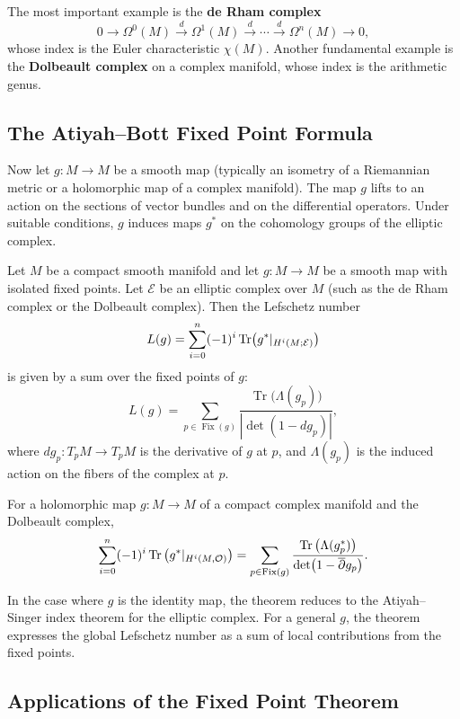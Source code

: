 The most important example is the \textbf{de Rham complex}
\[
0 \to \Omega^0(M) \xrightarrow{d} \Omega^1(M) \xrightarrow{d} \cdots \xrightarrow{d} \Omega^n(M) \to 0,
\]
whose index is the Euler characteristic \(\chi(M)\). Another fundamental example is the \textbf{Dolbeault complex} on a complex manifold, whose index is the arithmetic genus.

\subsection{The Atiyah--Bott Fixed Point Formula}

Now let \(g: M \to M\) be a smooth map (typically an isometry of a Riemannian metric or a holomorphic map of a complex manifold). The map \(g\) lifts to an action on the sections of vector bundles and on the differential operators. Under suitable conditions, \(g\) induces maps \(g^*\) on the cohomology groups of the elliptic complex.

\begin{theorem}
Let \(M\) be a compact smooth manifold and let \(g: M \to M\) be a smooth map with isolated fixed points. Let \(\mathcal{E}\) be an elliptic complex over \(M\) (such as the de Rham complex or the Dolbeault complex). Then the Lefschetz number
\[
L(g) = \sum_{i=0}^n (-1)^i \Tr(g^*|_{H^i(M; \mathcal{E})})
\]
is given by a sum over the fixed points of \(g\):
\[
L(g) = \sum_{p \in \operatorname{Fix}(g)} \frac{\operatorname{Tr}\big(\Lambda(g_p)\big)}{|\det(1 - dg_p)|},
\]
where \(dg_p: T_pM \to T_pM\) is the derivative of \(g\) at \(p\), and \(\Lambda(g_p)\) is the induced action on the fibers of the complex at \(p\).

For a holomorphic map \(g: M \to M\) of a compact complex manifold and the Dolbeault complex,
\[
\sum_{i=0}^n (-1)^i \Tr\big(g^*|_{H^i(M, \mathcal{O})}\big) = \sum_{p \in \operatorname{Fix}(g)} \frac{\operatorname{Tr}\big(\Lambda(g_p^*)\big)}{\det(1 - \overline{\partial} g_p)}.
\]
\end{theorem}

In the case where \(g\) is the identity map, the theorem reduces to the Atiyah--Singer index theorem for the elliptic complex. For a general \(g\), the theorem expresses the global Lefschetz number as a sum of local contributions from the fixed points.

\subsection{Applications of the Fixed Point Theorem}

